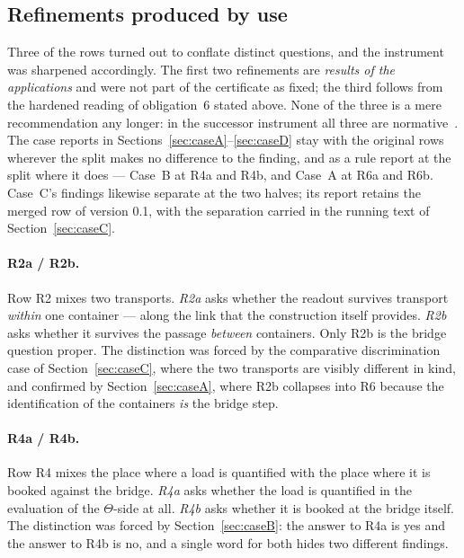 \documentclass[11pt,a4paper]{article}
\theoremstyle{definition}
\begin{document}
\subsection{Refinements produced by use}
\label{sec:splits}

Three of the rows turned out to conflate distinct questions, and the instrument
was sharpened accordingly. The first two refinements are \emph{results of the
applications} and were not part of the certificate as fixed; the third follows
from the hardened reading of obligation~6 stated above. None of the three is a
mere recommendation any longer: in the successor instrument all three are
normative~\cite{GeigerBCM2026}. The case reports in
Sections~\ref{sec:caseA}--\ref{sec:caseD} stay with the original rows wherever
the split makes no difference to the finding, and as a rule report at the split
where it does --- Case~B at R4a and R4b, and Case~A at R6a and R6b. Case~C's findings
likewise separate at the two halves; its report retains the merged row of
version 0.1, with the separation carried in the running text of
Section~\ref{sec:caseC}.

\paragraph{R2a / R2b.} Row R2 mixes two transports. \emph{R2a} asks whether the
readout survives transport \emph{within} one container --- along the link that the
construction itself provides. \emph{R2b} asks whether it survives the passage
\emph{between} containers. Only R2b is the bridge question proper. The distinction
was forced by the comparative discrimination case of
Section~\ref{sec:caseC}, where the two
transports are visibly different in kind, and confirmed by
Section~\ref{sec:caseA}, where R2b collapses into R6 because the identification of
the containers \emph{is} the bridge step.

\paragraph{R4a / R4b.} Row R4 mixes the place where a load is quantified with the
place where it is booked against the bridge. \emph{R4a} asks whether the load is
quantified in the evaluation of the $\Theta$-side at all. \emph{R4b} asks whether
it is booked at the bridge itself. The distinction was forced by
Section~\ref{sec:caseB}: the answer to R4a is yes and the answer to R4b is no, and
a single word for both hides two different findings.
\end{document}
